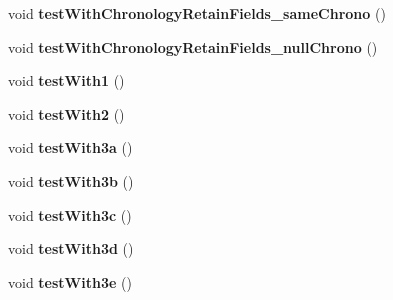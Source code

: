 \begin{DoxyCompactItemize}
\item 
\hypertarget{classorg_1_1joda_1_1time_1_1_test_partial___basics_ae7bb2188e32ae1363a227010b44f8e7f}{void {\bfseries test\-With\-Chronology\-Retain\-Fields\-\_\-same\-Chrono} ()}\label{classorg_1_1joda_1_1time_1_1_test_partial___basics_ae7bb2188e32ae1363a227010b44f8e7f}

\item 
\hypertarget{classorg_1_1joda_1_1time_1_1_test_partial___basics_a12bdbddfd7b3fb99a6882ed2fdea79ee}{void {\bfseries test\-With\-Chronology\-Retain\-Fields\-\_\-null\-Chrono} ()}\label{classorg_1_1joda_1_1time_1_1_test_partial___basics_a12bdbddfd7b3fb99a6882ed2fdea79ee}

\item 
\hypertarget{classorg_1_1joda_1_1time_1_1_test_partial___basics_af6442f10d6bc4077b9d7b15229d05809}{void {\bfseries test\-With1} ()}\label{classorg_1_1joda_1_1time_1_1_test_partial___basics_af6442f10d6bc4077b9d7b15229d05809}

\item 
\hypertarget{classorg_1_1joda_1_1time_1_1_test_partial___basics_ae6662814f85044ec51627a2f7f8883ce}{void {\bfseries test\-With2} ()}\label{classorg_1_1joda_1_1time_1_1_test_partial___basics_ae6662814f85044ec51627a2f7f8883ce}

\item 
\hypertarget{classorg_1_1joda_1_1time_1_1_test_partial___basics_a2a427fa9747b064c22039ee4b0b30daa}{void {\bfseries test\-With3a} ()}\label{classorg_1_1joda_1_1time_1_1_test_partial___basics_a2a427fa9747b064c22039ee4b0b30daa}

\item 
\hypertarget{classorg_1_1joda_1_1time_1_1_test_partial___basics_aff7e6b043e28a1e74be0e827dc021409}{void {\bfseries test\-With3b} ()}\label{classorg_1_1joda_1_1time_1_1_test_partial___basics_aff7e6b043e28a1e74be0e827dc021409}

\item 
\hypertarget{classorg_1_1joda_1_1time_1_1_test_partial___basics_a82b2ef616fd40f62f2dde90526b5ac5c}{void {\bfseries test\-With3c} ()}\label{classorg_1_1joda_1_1time_1_1_test_partial___basics_a82b2ef616fd40f62f2dde90526b5ac5c}

\item 
\hypertarget{classorg_1_1joda_1_1time_1_1_test_partial___basics_a5073344c3b5cc43f7478d74efaa8314e}{void {\bfseries test\-With3d} ()}\label{classorg_1_1joda_1_1time_1_1_test_partial___basics_a5073344c3b5cc43f7478d74efaa8314e}

\item 
\hypertarget{classorg_1_1joda_1_1time_1_1_test_partial___basics_a1ac31960e536eddaf26f1b4da6719409}{void {\bfseries test\-With3e} ()}\label{classorg_1_1joda_1_1time_1_1_test_partial___basics_a1ac31960e536eddaf26f1b4da6719409}


\end{DoxyCompactItemize}
